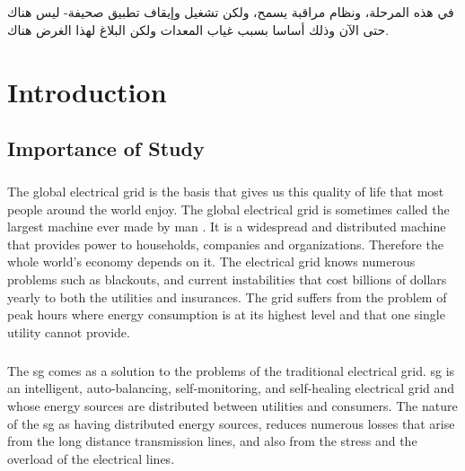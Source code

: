 \documentclass[oneside,12pt,a4paper,final]{book}
\begin{document}
\paragraph{}
\begin{arabtex}

في هذه المرحلة، ونظام مراقبة يسمح، ولكن تشغيل وإيقاف تطبيق صحيفة-
 ليس هناك حتى الآن وذلك أساسا بسبب غياب المعدات ولكن البلاغ لهذا الغرض هناك.
\end{arabtex}

\singlespacing

\tableofcontents
\listoffigures
\listoftables
\printglossaries

\mainmatter
\doublespacing
\chapter{Introduction}

\section{Importance of Study}
\paragraph{}
The global electrical grid is the basis that gives us this quality of life that most people around the world enjoy. The global electrical grid is sometimes called the largest machine ever made by man \cite{ref1}. It is a widespread and distributed machine that provides power to households, companies and organizations. Therefore the whole world's economy depends on it. The electrical grid knows numerous problems such as blackouts, and current instabilities that cost billions of dollars yearly to both the utilities and insurances. The grid suffers from the problem of peak hours where energy consumption is at its highest level and that one single utility cannot provide.
\paragraph{}
The \gls{sg} comes as a solution to the problems of the traditional electrical grid. \gls{sg} is an intelligent, auto-balancing, self-monitoring, and self-healing electrical grid \cite{ref2} and whose energy sources are distributed between utilities and consumers. The nature of the \gls{sg} as having distributed energy sources, reduces numerous losses that arise from the long distance transmission lines, and also from the stress and the overload of the electrical lines.
\end{document}
